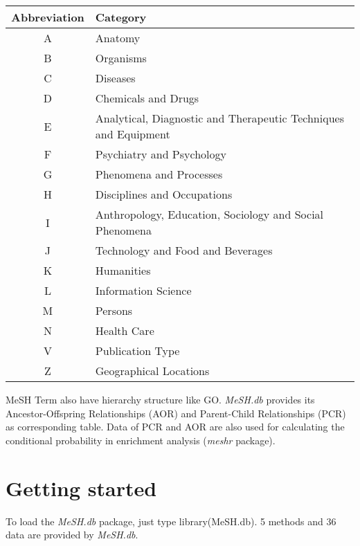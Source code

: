 \documentclass[11pt]{article}
\newcommand{\Rpackage}[1]{{\textit{#1}}}
\begin{document}
\begin{center}
  \begin{table}[htbp]
    \begin{tabular}{|c|l|}\hline
      Abbreviation & Category \\ \hline \hline
      A & Anatomy \\ \hline
      B & Organisms \\ \hline
      C & Diseases \\ \hline
      D & Chemicals and Drugs \\ \hline
      E & Analytical, Diagnostic and Therapeutic Techniques and Equipment \\ \hline
      F & Psychiatry and Psychology \\ \hline
      G & Phenomena and Processes \\ \hline
      H & Disciplines and Occupations \\ \hline
      I & Anthropology, Education, Sociology and Social Phenomena \\ \hline
      J & Technology and Food and Beverages \\ \hline
      K & Humanities \\ \hline
      L & Information Science \\ \hline
      M & Persons \\ \hline
      N & Health Care \\ \hline
      V & Publication Type \\ \hline
      Z & Geographical Locations \\ \hline
\end{tabular}
  \end{table}
\end{center}
MeSH Term also have hierarchy structure like GO. \Rpackage{MeSH.db} provides its Ancestor-Offspring Relationships (AOR) and Parent-Child Relationships (PCR) as corresponding table. Data of PCR and AOR are also used for calculating the conditional probability in enrichment analysis (\Rpackage{meshr} package).
\section{Getting started}
To load the \Rpackage{MeSH.db} package, just type library(MeSH.db). 5 methods and 36 data are provided by \Rpackage{MeSH.db}.
\end{document}
